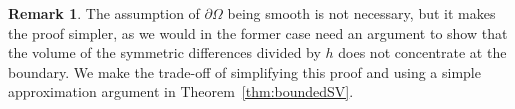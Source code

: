 \documentclass[11pt]{amsart}
\newcommand{\remkname}{Remark}
\theoremstyle{plain}
\theoremstyle{definition}
\newtheorem{remark}[theorem]{\remkname}
\newcommand{\dHn}{\,\dd\mathcal{H}^{n-1}}
\def\dd{{\rm d}}
\begin{document}


\begin{remark}\label{remark.no_smoothness_need}
  The assumption of $\partial \Omega$ being smooth is not necessary, but it makes the proof simpler, as we would in the former case need an argument to show that the volume of the symmetric differences divided by $h$ does not concentrate at the boundary. We make the trade-off of simplifying this proof and using a simple approximation argument in Theorem~\ref{thm:boundedSV}.
\end{remark}
\end{document}
